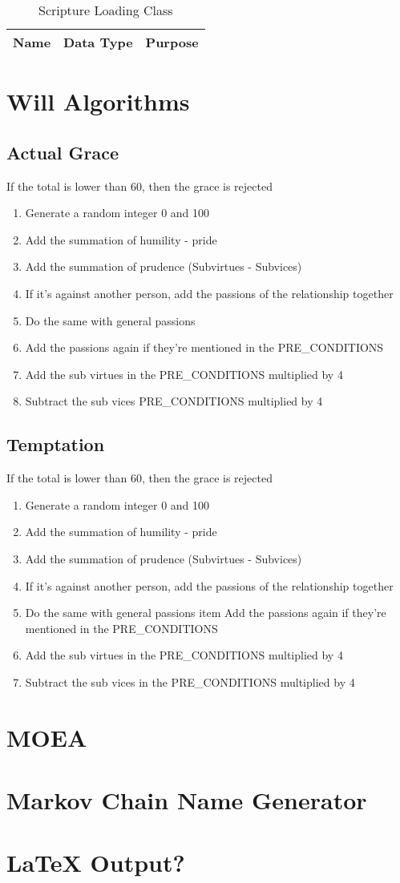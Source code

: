 \documentclass[10pt]{article}
\begin{document}
\begin{longtable}{| p{6cm} | p{3cm} | p{10cm} |}
\caption{Scripture Loading Class}
\label{tab:StoryEvent}\\
\hline 
\textbf{Name} & \textbf{Data Type} & \textbf{Purpose} \\
\hline

\end{longtable}
\section{Will Algorithms}
\subsection{Actual Grace}
If the total is lower than 60, then the grace is rejected
\begin{enumerate}
	\item Generate a random integer 0 and 100
	\item Add the summation of humility - pride
	\item Add the summation of prudence (Subvirtues - Subvices) 
	\item If it's against another person, add the passions of the relationship together
	\item Do the same with general passions
	\item Add the passions again if they're mentioned in the PRE\_CONDITIONS
	\item Add the sub virtues in the PRE\_CONDITIONS multiplied by 4
	\item Subtract the sub vices PRE\_CONDITIONS multiplied by 4
\end{enumerate}

\subsection{Temptation}
If the total is lower than 60, then the grace is rejected
\begin{enumerate}
	\item Generate a random integer 0 and 100
	\item Add the summation of humility - pride
	\item Add the summation of prudence (Subvirtues - Subvices) 
	\item If it's against another person, add the passions of the relationship together
	\item Do the same with general passions
	item Add the passions again if they're mentioned in the PRE\_CONDITIONS
	\item Add the sub virtues in the PRE\_CONDITIONS multiplied by 4
	\item Subtract the sub vices in the PRE\_CONDITIONS multiplied by 4
\end{enumerate}

\section{MOEA}

\section{Markov Chain Name Generator}

\section{LaTeX Output?}
\end{document}
